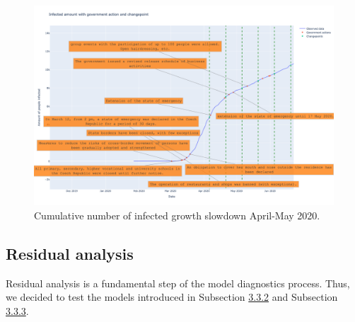 \begin{figure}[!htb]
\centering
\includegraphics[width=1.0\textwidth, height=0.5\textwidth]{figures/chapter_04/changepoints_vs_government/infected_summer_stop.png}
\caption{Cumulative number of infected growth slowdown April-May 2020.}
\label{fig:corr_inf_summer}
\end{figure}

\subsection{Residual analysis}

Residual analysis is a fundamental step of the model diagnostics process. Thus, we decided to test the models introduced in Subsection \hyperlink{ss332}{3.3.2} and Subsection \hyperlink{ss333}{3.3.3}. 

